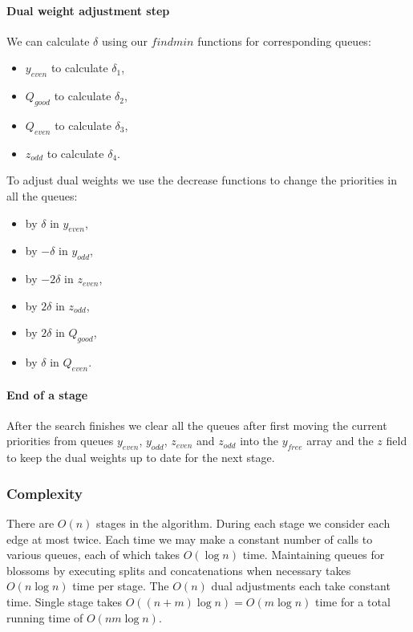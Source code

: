 \paragraph*{Dual weight adjustment step} We can calculate $\delta$ using our $findmin$ functions for corresponding queues: 
\begin{itemize}
    \item $y_{even}$ to calculate $\delta_1$,
    \item $Q_{good}$ to calculate $\delta_2$,
    \item $Q_{even}$ to calculate $\delta_3$,
    \item $z_{odd}$ to calculate $\delta_4$.
\end{itemize}

To adjust dual weights we use the decrease functions to change the priorities in all the queues:
\begin{itemize}
    \item by $\delta$ in $y_{even}$,
    \item by $-\delta$ in $y_{odd}$, 
    \item by $-2\delta$ in $z_{even}$,
    \item by $2\delta$ in $z_{odd}$,
    \item by $2\delta$ in $Q_{good}$,
    \item by $\delta$ in $Q_{even}$.
\end{itemize}

\paragraph*{End of a stage} After the search finishes we clear all the queues after first moving the current priorities from queues $y_{even}$, $y_{odd}$, $z_{even}$ and $z_{odd}$ into the $y_{free}$ array and the $z$ field to keep the dual weights up to date for the next stage.

\subsubsection{Complexity}

There are $O(n)$ stages in the algorithm. During each stage we consider each edge at most twice. Each time we may make a constant number of calls to various queues, each of which takes $O(\log n)$ time. Maintaining queues for blossoms by executing splits and concatenations when necessary takes $O(n \log n)$ time per stage. The $O(n)$ dual adjustments each take constant time. Single stage takes $O((n + m) \log n) = O(m \log n)$ time for a total running time of $O(nm \log n)$.

